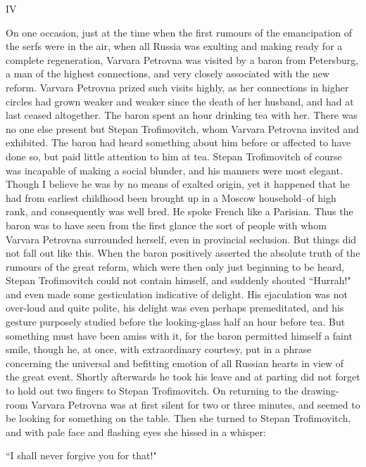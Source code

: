 \documentclass[12pt]{article}
\begin{document}
\vspace{12pt}
IV


\vspace{12pt}
On one occasion, just at the time when the first rumours of the
emancipation of the serfs were in the air, when all Russia was exulting
and making ready for a complete regeneration, Varvara Petrovna was
visited by a baron from Petersburg, a man of the highest connections,
and very closely associated with the new reform. Varvara Petrovna prized
such visits highly, as her connections in higher circles had grown
weaker and weaker since the death of her husband, and had at last ceased
altogether. The baron spent an hour drinking tea with her. There was no
one else present but Stepan Trofimovitch, whom Varvara Petrovna invited
and exhibited. The baron had heard something about him before or
affected to have done so, but paid little attention to him at tea.
Stepan Trofimovitch of course was incapable of making a social blunder,
and his manners were most elegant. Though I believe he was by no means
of exalted origin, yet it happened that he had from earliest childhood
been brought up in a Moscow household--of high rank, and consequently
was well bred. He spoke French like a Parisian. Thus the baron was to
have seen from the first glance the sort of people with whom Varvara
Petrovna surrounded herself, even in provincial seclusion. But things
did not fall out like this. When the baron positively asserted the
absolute truth of the rumours of the great reform, which were then
only just beginning to be heard, Stepan Trofimovitch could not contain
himself, and suddenly shouted ``Hurrah!" and even made some gesticulation
indicative of delight. His ejaculation was not over-loud and quite
polite, his delight was even perhaps premeditated, and his gesture
purposely studied before the looking-glass half an hour before tea. But
something must have been amiss with it, for the baron permitted himself
a faint smile, though he, at once, with extraordinary courtesy, put in
a phrase concerning the universal and befitting emotion of all Russian
hearts in view of the great event. Shortly afterwards he took his
leave and at parting did not forget to hold out two fingers to Stepan
Trofimovitch. On returning to the drawing-room Varvara Petrovna was
at first silent for two or three minutes, and seemed to be looking for
something on the table. Then she turned to Stepan Trofimovitch, and with
pale face and flashing eyes she hissed in a whisper:


\vspace{12pt}
``I shall never forgive you for that!"
\end{document}
